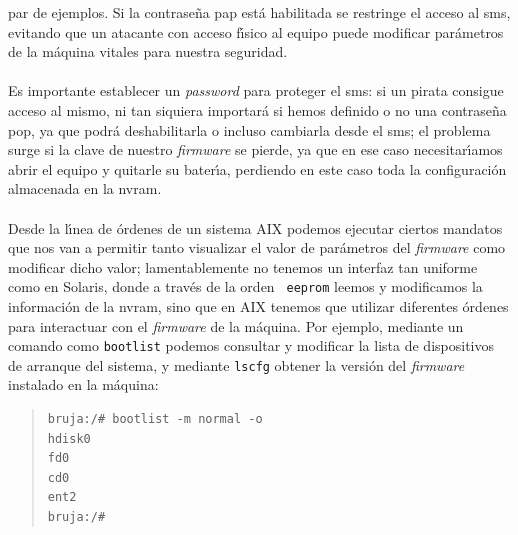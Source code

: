 par de ejemplos. Si la contrase\~na {\sc pap} est\'a habilitada se restringe el 
acceso al {\sc sms}, evitando que 
un atacante con acceso f\'{\i}sico al equipo puede modificar par\'ametros de la
m\'aquina vitales para nuestra seguridad.\\
\\Es importante establecer un {\it password} para proteger el {\sc sms}: si un
pirata consigue acceso al mismo, ni tan siquiera importar\'a si hemos definido 
o no
una contrase\~na {\sc pop}, ya que podr\'a deshabilitarla o incluso cambiarla
desde el {\sc sms}; el problema surge si la clave de nuestro {\it firmware} se
pierde, ya que en ese caso necesitar\'{\i}amos abrir el equipo y quitarle su
bater\'{\i}a, perdiendo en este caso toda la configuraci\'on almacenada en la
{\sc nvram}.\\
\\Desde la l\'{\i}nea de \'ordenes de un sistema AIX podemos ejecutar ciertos
mandatos que nos van a permitir tanto visualizar el valor de par\'ametros del 
{\it firmware} como modificar dicho valor; lamentablemente no tenemos un 
interfaz tan uniforme como en Solaris, donde a trav\'es de la orden {\tt 
eeprom} leemos y modificamos la informaci\'on de la {\sc nvram}, sino que en AIX
tenemos que utilizar diferentes \'ordenes para interactuar con el {\it 
firmware} de la m\'aquina. Por ejemplo, mediante un comando como {\tt bootlist}
podemos consultar y modificar la lista de dispositivos de arranque del sistema,
y mediante {\tt lscfg} obtener la versi\'on del {\it firmware} instalado en la
m\'aquina:
\begin{quote}
\begin{verbatim}
bruja:/# bootlist -m normal -o
hdisk0
fd0
cd0
ent2
bruja:/#
\end{verbatim}
\end{quote}
